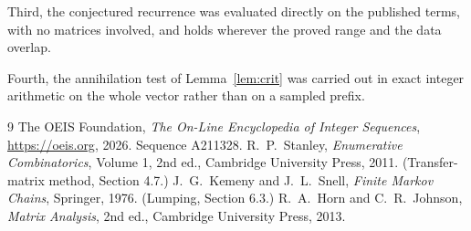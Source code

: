 \documentclass[11pt,a4paper]{article}
\theoremstyle{plain}
\theoremstyle{definition}
\begin{document}
Third, the conjectured recurrence was evaluated directly on the published terms, with no
matrices involved, and holds wherever the proved range and the data overlap.

Fourth, the annihilation test of Lemma~\ref{lem:crit} was carried out in exact integer
arithmetic on the whole vector rather than on a sampled prefix.

\begin{thebibliography}{9}
 The OEIS Foundation, \emph{The On-Line Encyclopedia of Integer
Sequences}, \url{https://oeis.org}, 2026. Sequence A211328.
 R.~P.~Stanley, \emph{Enumerative Combinatorics}, Volume 1, 2nd ed.,
Cambridge University Press, 2011. (Transfer-matrix method, Section 4.7.)
 J.~G.~Kemeny and J.~L.~Snell, \emph{Finite Markov Chains}, Springer, 1976.
(Lumping, Section 6.3.)
 R.~A.~Horn and C.~R.~Johnson, \emph{Matrix Analysis}, 2nd ed., Cambridge
University Press, 2013.
\end{thebibliography}
\end{document}
